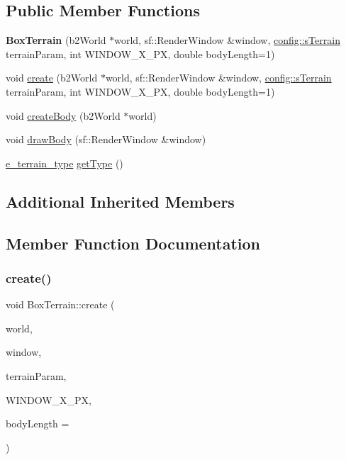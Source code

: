\subsection*{Public Member Functions}
\begin{DoxyCompactItemize}
\item 
\mbox{\label{class_box_terrain_a72f481873e9505c75a1702bd61eac8bf}} 
{\bfseries Box\+Terrain} (b2\+World $\ast$world, sf\+::\+Render\+Window \&window, \mbox{\hyperlink{structconfig_1_1s_terrain}{config\+::s\+Terrain}} terrain\+Param, int W\+I\+N\+D\+O\+W\+\_\+\+X\+\_\+\+PX, double body\+Length=1)
\item 
void \mbox{\hyperlink{class_box_terrain_a175fb845b46ed36cd0b4516b4bb64fb3}{create}} (b2\+World $\ast$world, sf\+::\+Render\+Window \&window, \mbox{\hyperlink{structconfig_1_1s_terrain}{config\+::s\+Terrain}} terrain\+Param, int W\+I\+N\+D\+O\+W\+\_\+\+X\+\_\+\+PX, double body\+Length=1)
\item 
void \mbox{\hyperlink{class_box_terrain_a7f5172beaa4e5dcb4d45f3c5e46e3155}{create\+Body}} (b2\+World $\ast$world)
\item 
void \mbox{\hyperlink{class_box_terrain_a309e67722a008ef166198d36add1690a}{draw\+Body}} (sf\+::\+Render\+Window \&window)
\item 
\mbox{\hyperlink{_terrain_8h_a6d0b7e83bb7325270c1162bece970fd8}{e\+\_\+terrain\+\_\+type}} \mbox{\hyperlink{class_box_terrain_a8056b743b0cc1fbd38e742f542dfa34b}{get\+Type}} ()
\end{DoxyCompactItemize}
\subsection*{Additional Inherited Members}


\subsection{Member Function Documentation}
\mbox{\label{class_box_terrain_a175fb845b46ed36cd0b4516b4bb64fb3}} 
\subsubsection{\texorpdfstring{create()}{create()}}
{\footnotesize\ttfamily void Box\+Terrain\+::create (\begin{DoxyParamCaption}\item[{b2\+World $\ast$}]{world,  }\item[{sf\+::\+Render\+Window \&}]{window,  }\item[{\mbox{\hyperlink{structconfig_1_1s_terrain}{config\+::s\+Terrain}}}]{terrain\+Param,  }\item[{int}]{W\+I\+N\+D\+O\+W\+\_\+\+X\+\_\+\+PX,  }\item[{double}]{body\+Length = {} }\end{DoxyParamCaption})\hspace{0.3cm}{\ttfamily [virtual]}}


